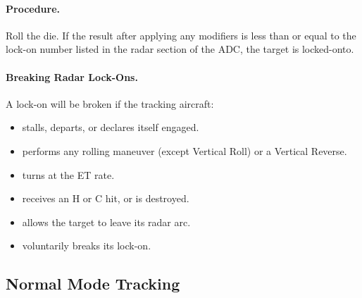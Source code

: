 {\paragraph{Procedure.} Roll the die. If the result after applying any modifiers is less than or equal to the lock-on number listed in the radar section of the ADC, the target is locked-onto. 

\paragraph{Breaking Radar Lock-Ons.} A lock-on will be broken if the tracking aircraft:

\begin{itemize}

    \item stalls, departs, or declares itself engaged.

    \item performs any rolling maneuver (except Vertical Roll) or a Vertical Reverse.

    \item turns at the ET rate.

    \item receives an H or C hit, or is destroyed.

    \item allows the target to leave its radar arc.

    \item voluntarily breaks its lock-on.

\end{itemize}

}{
\subsection{Normal Mode Tracking}
\label{rule:normal-mode-tracking}



}
